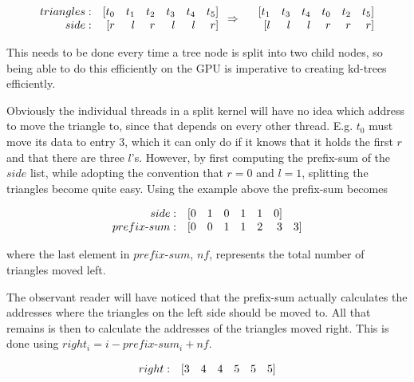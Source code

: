 \begin{displaymath}
  \begin{array} {r r r r r r r}
    triangles: & [t_0 & t_1 & t_2 & t_3 & t_4 & t_5]\\
    side: & [r & l & r & l & l & r]\\
  \end{array}
  \Rightarrow
  \begin{array} {r r r r r r r}
    &[t_1 & t_3 & t_4 & t_0 & t_2 & t_5]\\
    &[l & l & l & r & r & r]\\
  \end{array}
\end{displaymath}

This needs to be done every time a tree node is split into two child nodes, so
being able to do this efficiently on the GPU is imperative to creating kd-trees
efficiently.

Obviously the individual threads in a split kernel will have no idea which
address to move the triangle to, since that depends on every other
thread. E.g. $t_0$ must move its data to entry 3, which it can only do if it
knows that it holds the first $r$ and that there are three $l$'s. However, by
first computing the prefix-sum of the $side$ list, while adopting the convention
that $r = 0$ and $l = 1$, splitting the triangles become quite easy. Using the
example above the prefix-sum becomes

\begin{displaymath}
  \begin{array} {r r r r r r r r}
    side: & [0 & 1 & 0 & 1 & 1 & 0]\\
    prefix\text{-}sum: & [0 & 0 & 1 & 1 & 2 & 3 & 3]
  \end{array}
\end{displaymath}

where the last element in $prefix\text{-}sum$, $nf$, represents the total number
of triangles moved left.

The observant reader will have noticed that the prefix-sum actually calculates
the addresses where the triangles on the left side should be moved to. All that
remains is then to calculate the addresses of the triangles moved right. This is
done using $right_i = i - prefix\text{-}sum_i + nf$.

\begin{displaymath}
  \begin{array} {r r r r r r r}
    right: & [3 & 4 & 4 & 5 & 5 & 5]
  \end{array}
\end{displaymath}

